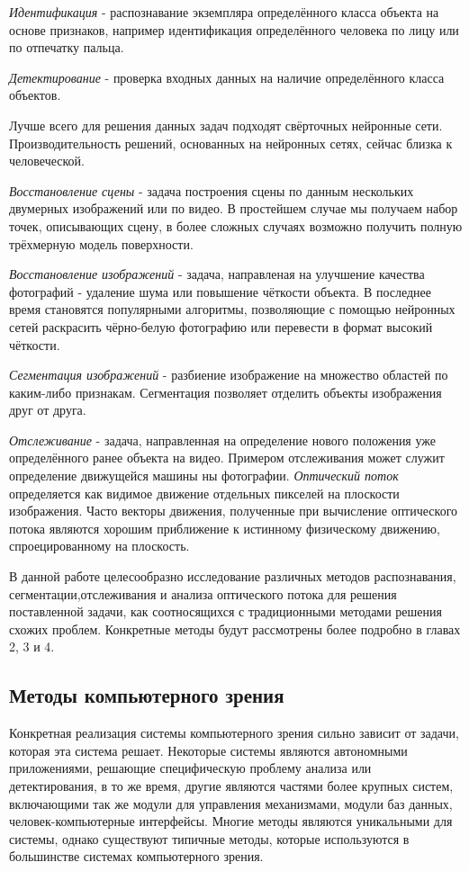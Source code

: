 \documentclass[times]{itmo-student-thesis}
\begin{document}
\textit{Идентификация} - распознавание экземпляра определённого класса объекта на основе признаков, например идентификация определённого человека по лицу или по отпечатку пальца.

\textit{Детектирование} - проверка входных данных на наличие определённого класса объектов. 

Лучше всего для решения данных задач подходят свёрточных нейронные сети. Производительность решений, основанных на нейронных сетях, сейчас близка к человеческой. 

\textit{Восстановление сцены } - задача построения сцены по данным нескольких двумерных изображений или по видео. В простейшем случае мы получаем набор точек, описывающих сцену, в более сложных случаях возможно получить полную трёхмерную модель поверхности. 

\textit{Восстановление изображений} - задача, направленая на улучшение качества фотографий - удаление шума или повышение чёткости объекта. В последнее время становятся популярными алгоритмы, позволяющие с помощью нейронных сетей раскрасить чёрно-белую фотографию или перевести в формат высокий чёткости.

\textit{Сегментация изображений} - разбиение изображение на множество областей по каким-либо признакам. Сегментация позволяет отделить объекты изображения друг от друга. 

\textit{Отслеживание } - задача, направленная на определение нового положения уже определённого ранее объекта на видео. Примером отслеживания  может служит определение движущейся машины ны фотографии.
\textit{Оптический поток} определяется как видимое движение отдельных пикселей на плоскости изображения. Часто векторы движения, полученные при вычисление оптического потока являются хорошим приближение к истинному физическому движению, спроецированному на плоскость.

В данной работе целесообразно исследование различных методов распознавания, сегментации,отслеживания и анализа оптического потока для решения поставленной задачи, как соотносящихся с традиционными методами решения схожих проблем. Конкретные методы будут рассмотрены более подробно в главах 2, 3 и 4.
\subsection{Методы компьютерного зрения}\label{cvmethods}

Конкретная реализация системы компьютерного зрения сильно зависит от задачи, которая эта система решает. Некоторые системы являются автономными приложениями, решающие специфическую проблему анализа или детектирования, в то же время, другие являются частями более крупных систем, включающими так же модули для управления механизмами, модули баз данных, человек-компьютерные интерфейсы.
Многие методы являются уникальными для системы, однако существуют типичные методы, которые используются в большинстве системах компьютерного зрения.
\end{document}
